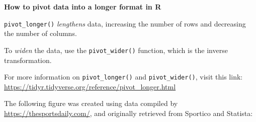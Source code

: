 \documentclass[
]{book}
\begin{document}
\begin{blackbox}

\begin{center}
\textbf{How to pivot data into a longer format in R}

\end{center}

\texttt{pivot\_longer()} \emph{lengthens} data, increasing the number of rows and decreasing the number of columns.

To \emph{widen} the data, use the \texttt{pivot\_wider()} function, which is the inverse transformation.

For more information on \texttt{pivot\_longer()} and \texttt{pivot\_wider()}, visit this link: \url{https://tidyr.tidyverse.org/reference/pivot_longer.html}

\end{blackbox}

The following figure was created using data compiled by \url{https://thesportsdaily.com/}, and originally retrieved from Sportico and Statista:
\end{document}
